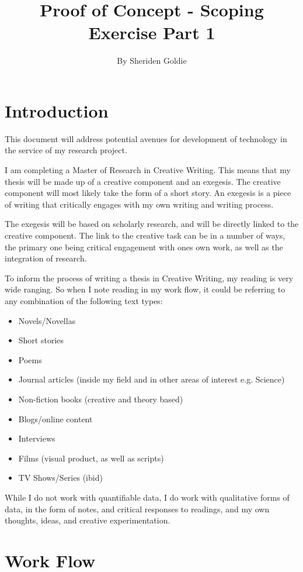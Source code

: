 \documentclass{article}
\title{Proof of Concept - Scoping Exercise Part 1}
\author{By Sheriden Goldie}
\date{}
\begin{document}
\maketitle

\tableofcontents
\pagebreak

\section{Introduction}
This document will address potential avenues for development of technology in the service of my research project. 

I am completing a Master of Research in Creative Writing. This means that my thesis will be made up of a creative component and an exegesis. The creative component will most likely take the form of a short story. An exegesis is a piece of writing that critically engages with my own writing and writing process. 

The exegesis will be based on scholarly research, and will be directly linked to the creative component. The link to the creative task can be in a number of ways, the primary one being critical engagement with ones own work, as well as the integration of research. 

To inform the process of writing a thesis in Creative Writing, my reading is very wide ranging. So when I note reading in my work flow, it could be referring to any combination of the following text types:
\begin{itemize}
    \item Novels/Novellas
    \item Short stories
    \item Poems
    \item Journal articles (inside my field and in other areas of interest e.g. Science)
    \item Non-fiction books (creative and theory based)
    \item Blogs/online content
    \item Interviews
    \item Films (visual product, as well as scripts)
    \item TV Shows/Series (ibid)
\end{itemize}

While I do not work with quantifiable data, I do work with qualitative forms of data, in the form of notes, and critical responses to readings, and my own thoughts, ideas, and creative experimentation.

\section{Work Flow}
\end{document}
